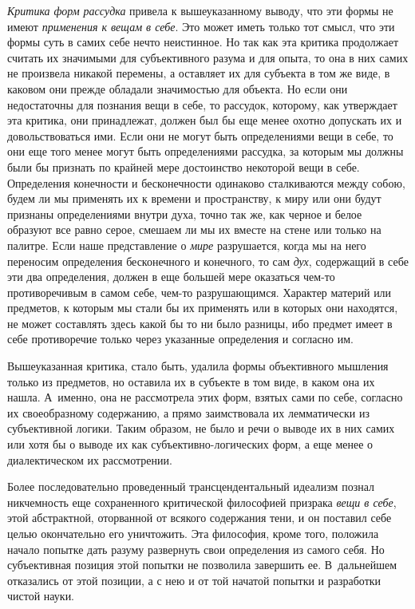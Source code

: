 {\em Критика форм рассудка} привела к вышеуказанному
выводу, что эти формы не имеют {\em применения к вещам
в себе}. Это может иметь только тот смысл, что эти формы суть в самих себе
нечто неистинное. Но так как эта критика продолжает считать их значимыми
для субъективного разума и для опыта, то она в них самих не произвела
никакой перемены, а оставляет их для субъекта в том же виде, в каковом они
прежде обладали значимостью для объекта. Но если они недостаточны для
познания вещи в себе, то рассудок, которому, как утверждает эта критика,
они принадлежат, должен был бы еще менее охотно допускать их и
довольствоваться ими. Если они не могут быть определениями вещи в себе, то
они еще того менее могут быть определениями рассудка, за которым мы должны
были бы признать по крайней мере достоинство некоторой вещи в себе.
Определения конечности и бесконечности одинаково сталкиваются между собою,
будем ли мы применять их к времени и пространству, к миру или они будут
признаны определениями внутри духа, точно так же, как черное и белое
образуют все равно серое, смешаем ли мы их вместе на стене или только на
палитре. Если наше представление о {\em мире}
разрушается, когда мы на него переносим определения бесконечного и
конечного, то сам {\em дух}, содержащий в себе эти два
определения, должен в еще большей мере оказаться чем-то противоречивым в
самом себе, чем-то разрушающимся. Характер материй или предметов, к которым
мы стали бы их применять или в которых они находятся, не может составлять
здесь какой бы то ни было разницы, ибо предмет имеет в себе противоречие
только через указанные определения и согласно им.

Вышеуказанная критика, стало быть, удалила формы объективного мышления
только из предметов, но оставила их в субъекте в том виде, в каком она их
нашла. А~именно, она не рассмотрела этих форм, взятых сами по себе,
согласно их своеобразному содержанию, а прямо заимствовала их лемматически
из субъективной логики. Таким образом, не было и речи о выводе их в них
самих или хотя бы о выводе их как субъективно-логических форм, а еще менее
о диалектическом их рассмотрении.

Более последовательно проведенный трансцендентальный идеализм познал
никчемность еще сохраненного критической философией призрака
{\em вещи в себе}, этой абстрактной, оторванной от
всякого содержания тени, и он поставил себе целью окончательно его
уничтожить.
Эта философия, кроме того, положила начало попытке дать разуму развернуть
свои определения из самого себя. Но субъективная позиция этой попытки не
позволила завершить ее. В~дальнейшем отказались от этой позиции, а с нею и
от той начатой попытки и разработки чистой науки.

